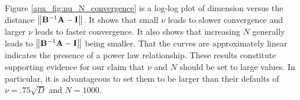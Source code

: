 \documentclass[mnsc,blindrev]{informs3}
\newcommand{\bA}{\mathbf{A}}
\newcommand{\bB}{\mathbf{B}}
\newcommand{\bI}{\mathbf{I}}
\begin{document}
                    Figure \ref{apx_fig:nu_N_convergence} is a log-log plot of dimension versus the distance $\norm{\bB^{-1}\bA - \mathbf{I}}$. It shows that small $\nu$ leads to slower convergence and larger $\nu$ leads to faster convergence. It also shows that increasing $N$ generally leads to $\norm{\bB^{-1}\bA - \bI}$ being smaller. That the curves are approximately linear indicates the presence of a power law relationship. These results constitute supporting evidence for our claim that $\nu$ and $N$ should be set to large values. In particular, it is advantageous to set them to be larger than their defaults of $\nu=.75\sqrt{D}$ and $N=1000$. 
                    

    

    
\end{document}
